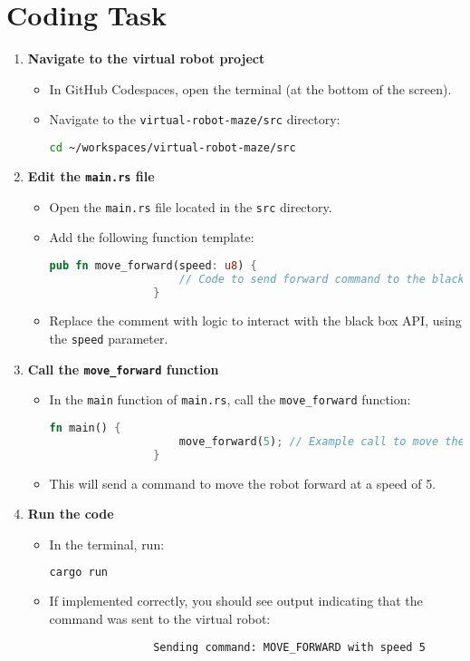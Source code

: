 \documentclass[12pt]{article}
\begin{document}
	\section*{Coding Task}
	\begin{enumerate}
		\item \textbf{Navigate to the virtual robot project}
		\begin{itemize}
			\item In GitHub Codespaces, open the terminal (at the bottom of the screen).
			\item Navigate to the \texttt{virtual-robot-maze/src} directory:
			\begin{lstlisting}[language=bash]
				cd ~/workspaces/virtual-robot-maze/src
			\end{lstlisting}
		\end{itemize}
		
		\item \textbf{Edit the \texttt{main.rs} file}
		\begin{itemize}
			\item Open the \texttt{main.rs} file located in the \texttt{src} directory.
			\item Add the following function template:
			\begin{lstlisting}[language=Rust]
				pub fn move_forward(speed: u8) {
					// Code to send forward command to the black box API
				}
			\end{lstlisting}
			\item Replace the comment with logic to interact with the black box API, using the \texttt{speed} parameter.
		\end{itemize}
		
		\item \textbf{Call the \texttt{move\_forward} function}
		\begin{itemize}
			\item In the \texttt{main} function of \texttt{main.rs}, call the \texttt{move\_forward} function:
			\begin{lstlisting}[language=Rust]
				fn main() {
					move_forward(5); // Example call to move the robot forward at speed 5
				}
			\end{lstlisting}
			\item This will send a command to move the robot forward at a speed of 5.
		\end{itemize}
		
		\item \textbf{Run the code}
		\begin{itemize}
			\item In the terminal, run:
			\begin{lstlisting}[language=bash]
				cargo run
			\end{lstlisting}
			\item If implemented correctly, you should see output indicating that the command was sent to the virtual robot:
			\begin{verbatim}
				Sending command: MOVE_FORWARD with speed 5
			\end{verbatim}
		\end{itemize}
	\end{enumerate}
	
\end{document}
